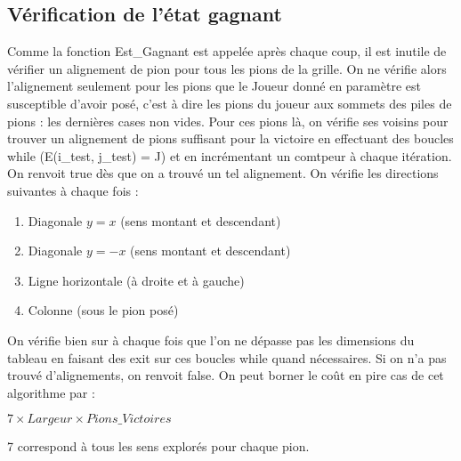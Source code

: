 \documentclass[a4paper, 10pt, french]{article}
\begin{document}
{    \subsection{Vérification de l'état gagnant}
    {
        Comme la fonction Est\_Gagnant est appelée après chaque coup, il est inutile de vérifier un alignement de pion pour
        tous les pions de la grille. On ne vérifie alors l'alignement seulement pour les pions que le Joueur donné en paramètre
        est susceptible d'avoir posé, c'est à dire les pions du joueur aux sommets des piles de pions : les dernières cases
        non vides.
        Pour ces pions là, on vérifie ses voisins pour trouver un alignement de pions suffisant pour la victoire en effectuant
        des boucles while (E(i\_test, j\_test) = J) et en incrémentant un comtpeur à chaque itération. On renvoit true dès que
        on a trouvé un tel alignement. On vérifie les directions suivantes à chaque fois :
        \begin{enumerate}
            \item Diagonale $y = x$ (sens montant et descendant)
            \item Diagonale $y = -x$ (sens montant et descendant)
            \item Ligne horizontale (à droite et à gauche)
            \item Colonne (sous le pion posé)
        \end{enumerate}
        On vérifie bien sur à chaque fois que l'on ne dépasse pas les dimensions du tableau en faisant des exit sur ces boucles
        while quand nécessaires. Si on n'a pas trouvé d'alignements, on renvoit false.
        On peut borner le coût en pire cas de cet algorithme par :
        \begin{center}
            $7 \times Largeur \times Pions\_Victoires$
        \end{center}
        7 correspond à tous les sens explorés pour chaque pion.
    }

}
\end{document}

